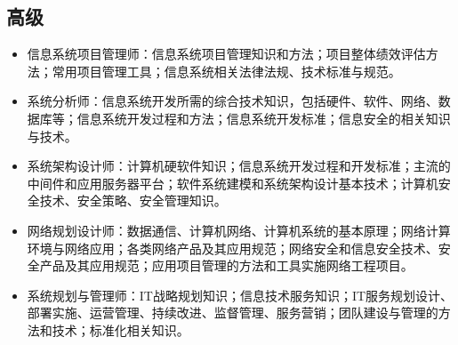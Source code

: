 \subsection{高级}
\begin{itemize}
\item 信息系统项目管理师：信息系统项目管理知识和方法；项目整体绩效评估方法；常用项目管理工具；信息系统相关法律法规、技术标准与规范。
\item 系统分析师：信息系统开发所需的综合技术知识，包括硬件、软件、网络、数据库等；信息系统开发过程和方法；信息系统开发标准；信息安全的相关知识与技术。
\item 系统架构设计师：计算机硬软件知识；信息系统开发过程和开发标准；主流的中间件和应用服务器平台；软件系统建模和系统架构设计基本技术；计算机安全技术、安全策略、安全管理知识。
\item 网络规划设计师：数据通信、计算机网络、计算机系统的基本原理；网络计算环境与网络应用；各类网络产品及其应用规范；网络安全和信息安全技术、安全产品及其应用规范；应用项目管理的方法和工具实施网络工程项目。
\item 系统规划与管理师：IT战略规划知识；信息技术服务知识；IT服务规划设计、部署实施、运营管理、持续改进、监督管理、服务营销；团队建设与管理的方法和技术；标准化相关知识。
\end{itemize}
